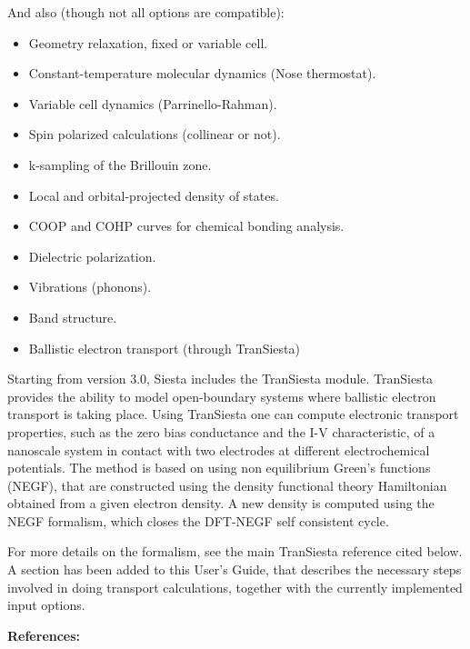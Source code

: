 \documentclass[11pt]{article}
\begin{document}
And also (though not all options are compatible):
\begin{itemize}
\item Geometry relaxation, fixed or variable cell.
\item Constant-temperature molecular dynamics (Nose thermostat).
\item Variable cell dynamics (Parrinello-Rahman).
\item Spin polarized calculations (collinear or not).
\item k-sampling of the Brillouin zone.
\item Local and orbital-projected density of states.
\item COOP and COHP curves for chemical bonding analysis.
\item Dielectric polarization.
\item Vibrations (phonons).
\item Band structure.
\item Ballistic electron transport (through {\sc TranSiesta})
\end{itemize}


Starting from version 3.0, {\sc Siesta} includes the {\sc
  TranSiesta} module.  {\sc
  TranSiesta} provides the ability to model open-boundary systems
where ballistic electron transport is taking place.  Using {\sc
  TranSiesta} one can compute electronic transport properties, such as
the zero bias conductance and the I-V characteristic, of a nanoscale
system in contact with two electrodes at different electrochemical
potentials.  The method is based on using non equilibrium Green's
functions (NEGF), that are constructed using the density functional
theory Hamiltonian obtained from a given electron density. A new
density is computed using the NEGF formalism, which closes the
DFT-NEGF self consistent cycle.

For more details on the formalism, see the main {\sc TranSiesta}
reference cited below. A section has been added to this User's Guide,
that describes the necessary steps involved in doing transport
calculations, together with the currently implemented input options.

\vspace{0.5cm}
{\large {\bf References:} }
\end{document}
